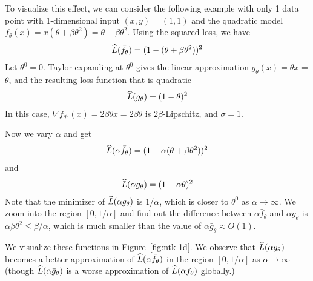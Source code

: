 \begin{enumerate}
\begin{remark}
    To visualize this effect, we can consider the following example with only 1 data point with 1-dimensional input $(x,y) = (1,1)$ and the quadratic model $\bar{f}_\theta(x) = x(\theta + \beta \theta^2) = \theta + \beta \theta^2$. Using the squared loss, we have 
    \begin{align}
    \widehat{L}(\bar{f}_\theta) = (1- (\theta + \beta \theta^2))^2 
    \end{align}
    Let $\theta^0 = 0$. Taylor expanding at $\theta^0$ gives the linear approximation $\bar{g}_\theta(x) = \theta x$ = $\theta$, and the resulting loss function that is quadratic 
    \begin{align}
    \widehat{L}(\bar{g}_\theta) = (1- \theta)^2 
    \end{align}
	In this case,  $\nabla f_{\theta^0}(x) = 2\beta \theta x = 2\beta \theta$ is $2\beta$-Lipschitz, and $ \sigma = 1$. 
	
	Now we vary $\alpha$ and get 
    \begin{align}
\widehat{L}(\alpha \bar{f}_\theta) = (1- \alpha(\theta + \beta \theta^2))^2 
\end{align}	
and 
\begin{align}
\widehat{L}(\alpha\bar{g}_\theta) = (1- \alpha\theta)^2 
\end{align}
Note that the minimizer of $	\widehat{L}(\alpha\bar{g}_\theta) $ is $1/\alpha$, which is closer to $\theta^0$ as $\alpha\rightarrow \infty$. We zoom into the region $[0, 1/\alpha]$ and find out the difference between $\alpha \bar{f}_\theta$ and $\alpha \bar{g}_\theta$ is $\alpha \beta\theta^2 \le  \beta/\alpha$, which is much smaller than the value of $\alpha \bar{g}_\theta \approx O(1)$. 

We visualize these functions in Figure~\ref{fig:ntk-1d}. We observe that $\widehat{L}(\alpha\bar{g}_\theta) $ becomes a better approximation of $\widehat{L}(\alpha\bar{f}_\theta)$ in the region $[0,1/\alpha]$ as $\alpha \rightarrow \infty$ (though $\widehat{L}(\alpha\bar{g}_\theta)$ is a worse approximation of $\widehat{L}(\alpha\bar{f}_\theta)$ globally.)



\end{remark}
\end{enumerate}
